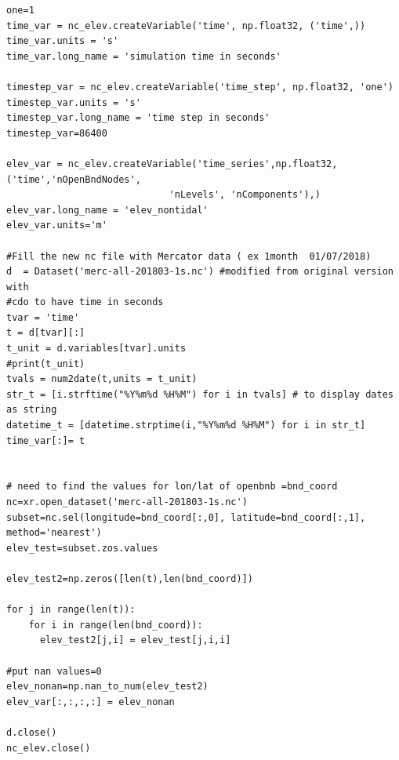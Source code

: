 \documentclass[preprints,briefreport,accept,oneauthor,pdftex]{Definitions/mdpi}
\begin{document}
\begin{verbatim}
one=1
time_var = nc_elev.createVariable('time', np.float32, ('time',))
time_var.units = 's'
time_var.long_name = 'simulation time in seconds'

timestep_var = nc_elev.createVariable('time_step', np.float32, 'one')
timestep_var.units = 's'
timestep_var.long_name = 'time step in seconds'
timestep_var=86400

elev_var = nc_elev.createVariable('time_series',np.float32,('time','nOpenBndNodes',
                             'nLevels', 'nComponents'),)
elev_var.long_name = 'elev_nontidal'
elev_var.units='m'

#Fill the new nc file with Mercator data ( ex 1month  01/07/2018)
d  = Dataset('merc-all-201803-1s.nc') #modified from original version with 
#cdo to have time in seconds
tvar = 'time'
t = d[tvar][:]
t_unit = d.variables[tvar].units
#print(t_unit)
tvals = num2date(t,units = t_unit)
str_t = [i.strftime("%Y%m%d %H%M") for i in tvals] # to display dates as string
datetime_t = [datetime.strptime(i,"%Y%m%d %H%M") for i in str_t]
time_var[:]= t


# need to find the values for lon/lat of openbnb =bnd_coord
nc=xr.open_dataset('merc-all-201803-1s.nc') 
subset=nc.sel(longitude=bnd_coord[:,0], latitude=bnd_coord[:,1], method='nearest')
elev_test=subset.zos.values

elev_test2=np.zeros([len(t),len(bnd_coord)])

for j in range(len(t)):
    for i in range(len(bnd_coord)):
      elev_test2[j,i] = elev_test[j,i,i]

#put nan values=0
elev_nonan=np.nan_to_num(elev_test2)
elev_var[:,:,:,:] = elev_nonan

d.close()
nc_elev.close()

\end{verbatim}
\clearpage
\end{document}
